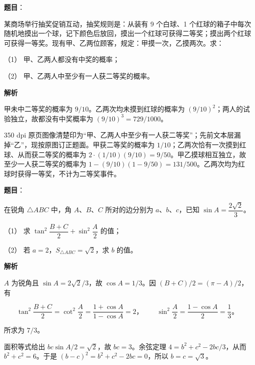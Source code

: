 \begin{answer}

\textbf{题目}：

某商场举行抽奖促销互动，抽奖规则是：从装有 9 个白球、1 个红球的箱子中每次随机地摸出一个球，记下颜色后放回，摸出一个红球可获得二等奖；摸出两个红球可获得一等奖。现有甲、乙两位顾客，规定：甲摸一次，乙摸两次。求：

（1） 甲、乙两人都没有中奖的概率；

（2） 甲、乙两人中至少有一人获二等奖的概率。

\textbf{解析}


甲未中二等奖的概率为 $9/10$。乙两次均未摸到红球的概率为 $(9/10)^2$；两人的试验独立，故都没有中奖概率为 $(9/10)^3=729/1000$。


350 dpi 原页图像清楚印为“甲、乙两人中至少有一人获二等奖”；先前文本层漏掉“乙”，现按原图订正题面。甲获二等奖的概率为 $1/10$；乙两次恰有一次摸到红球、从而获二等奖的概率为 $2\cdot(1/10)(9/10)=9/50$。甲乙摸球相互独立，故至少一人获二等奖的概率为 $1-(9/10)(1-9/50)=131/500$。乙两次均为红球时获得一等奖，不计为二等奖事件。



\end{answer}
\begin{answer}

\textbf{题目}：

在锐角 $\triangle ABC$ 中，角 $A\text{、}B\text{、}C$ 所对的边分别为 $a\text{、}b\text{、}c$，已知 $\sin A=\dfrac{2\sqrt2}{3}$。

（1） 求 $\tan^2\dfrac{B+C}{2}+\sin^2\dfrac A2$ 的值；

（2） 若 $a=2\text{，}S_{\triangle ABC}=\sqrt2$，求 $b$ 的值。

\textbf{解析}


$A$ 为锐角且 $\sin A=2\sqrt2/3$，故 $\cos A=1/3$。因 $(B+C)/2=(\pi-A)/2$，有

\nopagebreak[4]
\[\tan^2\frac{B+C}{2}=\cot^2\frac A2=\frac{1+\cos A}{1-\cos A}=2\text{，}\qquad \sin^2\frac A2=\frac{1-\cos A}{2}=\frac13\mbox{。}\]

所求为 $7/3$。


面积等式给出 $bc\sin A/2=\sqrt2$，故 $bc=3$。余弦定理 $4=b^2+c^2-2bc/3$，从而 $b^2+c^2=6$。于是 $(b-c)^2=b^2+c^2-2bc=0$，所以 $b=c=\sqrt3$。



\end{answer}
